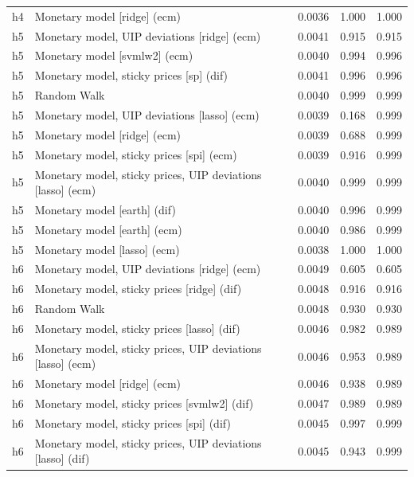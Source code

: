 \begin{ThreePartTable}
\begin{longtable}[t]{cp{5.5cm}ccc}
h4 & \raggedright Monetary model [ridge] (ecm) & 0.0036 & 1.000 & 1.000\\
\addlinespace
h5 & \raggedright Monetary model, UIP deviations [ridge] (ecm) & 0.0041 & 0.915 & 0.915\\
h5 & \raggedright Monetary model [svmlw2] (ecm) & 0.0040 & 0.994 & 0.996\\
h5 & \raggedright Monetary model, sticky prices [sp] (dif) & 0.0041 & 0.996 & 0.996\\
h5 & \raggedright Random Walk & 0.0040 & 0.999 & 0.999\\
h5 & \raggedright Monetary model, UIP deviations [lasso] (ecm) & 0.0039 & 0.168 & 0.999\\
h5 & \raggedright Monetary model [ridge] (ecm) & 0.0039 & 0.688 & 0.999\\
h5 & \raggedright Monetary model, sticky prices [spi] (ecm) & 0.0039 & 0.916 & 0.999\\
h5 & \raggedright Monetary model, sticky prices, UIP deviations [lasso] (ecm) & 0.0040 & 0.999 & 0.999\\
h5 & \raggedright Monetary model [earth] (dif) & 0.0040 & 0.996 & 0.999\\
h5 & \raggedright Monetary model [earth] (ecm) & 0.0040 & 0.986 & 0.999\\
h5 & \raggedright Monetary model [lasso] (ecm) & 0.0038 & 1.000 & 1.000\\
\addlinespace
h6 & \raggedright Monetary model, UIP deviations [ridge] (ecm) & 0.0049 & 0.605 & 0.605\\
h6 & \raggedright Monetary model, sticky prices [ridge] (dif) & 0.0048 & 0.916 & 0.916\\
h6 & \raggedright Random Walk & 0.0048 & 0.930 & 0.930\\
h6 & \raggedright Monetary model, sticky prices [lasso] (dif) & 0.0046 & 0.982 & 0.989\\
h6 & \raggedright Monetary model, sticky prices, UIP deviations [lasso] (ecm) & 0.0046 & 0.953 & 0.989\\
h6 & \raggedright Monetary model [ridge] (ecm) & 0.0046 & 0.938 & 0.989\\
h6 & \raggedright Monetary model, sticky prices [svmlw2] (dif) & 0.0047 & 0.989 & 0.989\\
h6 & \raggedright Monetary model, sticky prices [spi] (dif) & 0.0045 & 0.997 & 0.999\\
h6 & \raggedright Monetary model, sticky prices, UIP deviations [lasso] (dif) & 0.0045 & 0.943 & 0.999\\

\end{longtable}
\end{ThreePartTable}
